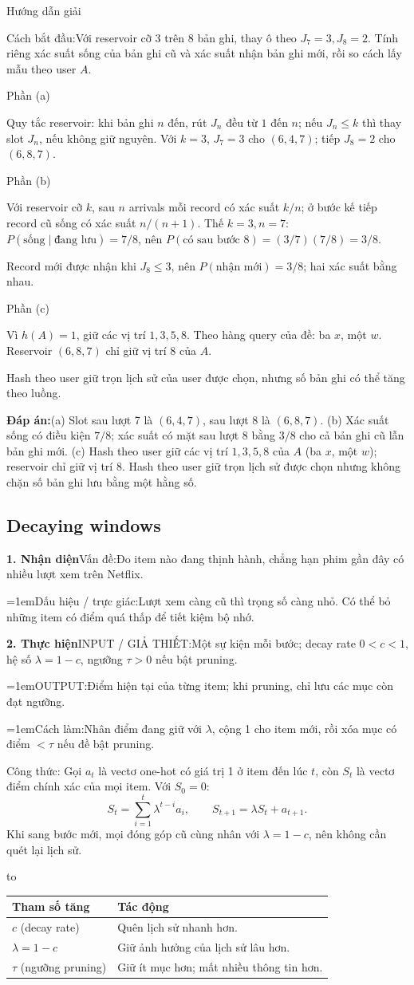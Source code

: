 \documentclass[10pt,a4paper,twocolumn]{article}
\makeatletter
\newcommand{\maptag}[1]{\phantomsection\@bsphack\protected@write\@auxout{}{\string\newlabel{#1}{{}{\thepage}{}{\@currentHref}{}}}\@esphack}
\newif\ifexamheadingprinted
\newcommand{\topic}[2]{%
  \global\examheadingprintedfalse\par\subsection{#2}\label{topic:#1}}
\newcommand{\key}[1]{#1:\enspace}
\newcommand{\solutionprompt}[1]{\par\addvspace{1pt}\noindent\key{Cách bắt đầu}#1\par\addvspace{2pt}}
\newcommand{\blocklabel}[1]{\par\noindent#1\par\nobreak}
\newcommand{\answer}[1]{%
  \par\addvspace{3pt}%
  \blocklabel{#1Hướng dẫn giải}}
\newcommand{\finalanswer}[1]{%
  \par\addvspace{3pt}\noindent\textbf{Đáp án:}\nobreak\enspace#1\par}
\newcommand{\guidepart}[1]{%
  \par\addvspace{1.5pt}%
  \blocklabel{Phần #1}}
\newenvironment{examtable}[1]{%
  \par\addvspace{2pt}\noindent\hbox to \linewidth\bgroup\hfil
  \setlength{\tabcolsep}{4pt}%
  \renewcommand{\arraystretch}{1.12}\begin{tabular}{#1}%
}{\end{tabular}\hfil\egroup\par\addvspace{2pt}}
\newcommand{\algfield}[2]{\par\noindent\hangindent=1em\relax#1:\enspace#2}
\newcommand{\unitfield}[4]{%
  \par\noindent\textbf{#1. #2}\enspace #3:\enspace #4}
\newcommand{\algsummary}[6]{%
  \begingroup\setlength{\parskip}{1pt}%
  \unitfield{1}{Nhận diện}{Vấn đề}{#1}%
  \algfield{Dấu hiệu / trực giác}{#2}%
  \if\relax\detokenize{#3}\relax\else\par\noindent#3\par\fi%
  \unitfield{2}{Thực hiện}{INPUT / GIẢ THIẾT}{#4}%
  \algfield{OUTPUT}{#5}%
  \algfield{Cách làm}{#6}\par\endgroup}
\makeatother
\begin{document}
\answer{\maptag{answer:Pr21}}
\solutionprompt{Với reservoir cỡ 3 trên 8 bản ghi, thay ô theo $J_7=3,J_8=2$. Tính riêng xác suất sống của bản ghi cũ và xác suất nhận bản ghi mới, rồi so cách lấy mẫu theo user $A$.}
\guidepart{(a)}
\begin{guidesteps}
\item Quy tắc reservoir: khi bản ghi $n$ đến, rút $J_n$ đều từ $1$ đến $n$; nếu $J_n\le k$ thì thay slot $J_n$, nếu không giữ nguyên. Với $k=3$, $J_7=3$ cho $(6,4,7)$; tiếp $J_8=2$ cho $(6,8,7)$.
\end{guidesteps}
\guidepart{(b)}
\begin{guidesteps}
\item Với reservoir cỡ $k$, sau $n$ arrivals mỗi record có xác suất $k/n$; ở bước kế tiếp record cũ sống có xác suất $n/(n+1)$. Thế $k=3,n=7$: $P(\text{sống}\mid\text{đang lưu})=7/8$, nên $P(\text{có sau bước 8})=(3/7)(7/8)=3/8$.
\item Record mới được nhận khi $J_8\le3$, nên $P(\text{nhận mới})=3/8$; hai xác suất bằng nhau.
\end{guidesteps}
\guidepart{(c)}
\begin{guidesteps}
\item Vì $h(A)=1$, giữ các vị trí $1,3,5,8$. Theo hàng query của đề: ba $x$, một $w$. Reservoir $(6,8,7)$ chỉ giữ vị trí 8 của $A$.
\item Hash theo user giữ trọn lịch sử của user được chọn, nhưng số bản ghi có thể tăng theo luồng.
\end{guidesteps}
\finalanswer{(a) Slot sau lượt 7 là $(6,4,7)$, sau lượt 8 là $(6,8,7)$. (b) Xác suất sống có điều kiện $7/8$; xác suất có mặt sau lượt 8 bằng $3/8$ cho cả bản ghi cũ lẫn bản ghi mới. (c) Hash theo user giữ các vị trí $1,3,5,8$ của $A$ (ba $x$, một $w$); reservoir chỉ giữ vị trí 8. Hash theo user giữ trọn lịch sử được chọn nhưng không chặn số bản ghi lưu bằng một hằng số.}
\topic{decay}{Decaying windows}

\algsummary{Đo item nào đang thịnh hành, chẳng hạn phim gần đây có nhiều lượt xem trên Netflix.}{Lượt xem càng cũ thì trọng số càng nhỏ. Có thể bỏ những item có điểm quá thấp để tiết kiệm bộ nhớ.}{}{Một sự kiện mỗi bước; decay rate $0<c<1$, hệ số $\lambda=1-c$, ngưỡng $\tau>0$ nếu bật pruning.}{Điểm hiện tại của từng item; khi pruning, chỉ lưu các mục còn đạt ngưỡng.}{Nhân điểm đang giữ với $\lambda$, cộng 1 cho item mới, rồi xóa mục có điểm $<\tau$ nếu đề bật pruning.}

\key{Công thức} Gọi $a_t$ là vectơ one-hot có giá trị 1 ở item đến lúc $t$, còn $S_t$ là vectơ điểm chính xác của mọi item. Với $S_0=0$:
\[
S_t=\sum_{i=1}^{t}\lambda^{t-i}a_i,\qquad
S_{t+1}=\lambda S_t+a_{t+1}.
\]
Khi sang bước mới, mọi đóng góp cũ cùng nhân với $\lambda=1-c$, nên không cần quét lại lịch sử.
\begin{examtable}{@{}ll@{}}
\toprule
Tham số tăng & Tác động\\
\midrule
$c$ (decay rate) & Quên lịch sử nhanh hơn.\\
$\lambda=1-c$ & Giữ ảnh hưởng của lịch sử lâu hơn.\\
$\tau$ (ngưỡng pruning) & Giữ ít mục hơn; mất nhiều thông tin hơn.\\
\bottomrule
\end{examtable}
\end{document}
